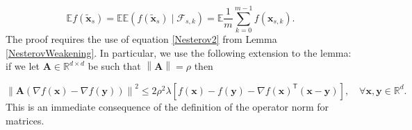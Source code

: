 \documentclass[11pt] {article}
\newcommand{\norm}[1]{\left\lVert#1\right\rVert}
\newcommand{\x}{\pmb{x}}
\newcommand{\A}{\pmb{A}}
\newcommand{\y}{\pmb{y}}
\newcommand{\Expectation}{\mathbb{E}}
\newcommand{\T}{\mathsf{T}}
\newcommand{\reals}{\mathbb{R}}
\newtheorem{lemma}{Lemma}
\begin{document}
\begin{equation}\label{doubleexpect}
\Expectation f(\tilde{\x}_s) = \Expectation \Expectation (f(\tilde{\x}_s)\mid \mathcal{F}_{s,k}) = \Expectation \frac{1}{m}\sum_{k=0}^{m-1} f(\x_{s,k}).
\end{equation}
%
The proof requires the use of equation \eqref{Nesterov2} from Lemma \ref{NesterovWeakening}. In particular, we use the following extension to the lemma: if we let $\A \in \reals^{d \times d}$ be such that $\norm{\A} = \rho$ then 

%
%	
%
%
%	
%	
%	
%	
%	


	\begin{equation} \label{eqn:op-ineq}
	\norm{\A(\nabla f(\x) - \nabla f(\y))}^2 \leq 2\rho^2\lambda \left[f(\x) - f(\y) - \nabla f(\x)^{\T} (\x-\y)\right], \quad \forall \x, \y \in \reals^d .
	\end{equation}
%
This is an immediate consequence of the definition of the operator norm for matrices.
\end{document}

